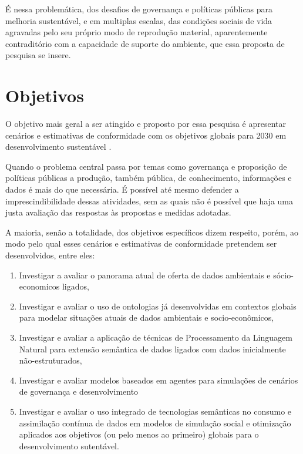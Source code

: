 \documentclass[
	11pt,				%
	openany,			%
	oneside,			%
	a4paper,			%
	english,			%
	french,				%
	spanish,			%
	brazil,				%
	]{abntex2}
\begin{document}
É nessa problemática, dos desafios de governança e políticas públicas para melhoria sustentável, e em multiplas escalas, das condições sociais de vida agravadas pelo seu próprio modo de reprodução material, aparentemente contraditório com a capacidade de suporte do ambiente, que essa proposta de pesquisa se insere. 

\chapter{Objetivos}

O objetivo mais geral a ser atingido e proposto por essa pesquisa é apresentar cenários e estimativas de conformidade \cite{patterson_exploring_2016} com os objetivos globais para 2030 em desenvolvimento sustentável \cite{united_nations_transforming_2015}.

Quando o problema central passa por temas como governança e proposição de políticas públicas a produção, também pública, de conhecimento, informações e dados é mais do que necessária. É possível até mesmo defender a imprescindibilidade dessas atividades, sem as quais não é possível que haja uma justa avaliação das respostas às propostas e medidas adotadas.

A maioria, senão a totalidade, dos objetivos específicos dizem respeito, porém, ao modo pelo qual esses cenários e estimativas de conformidade pretendem ser desenvolvidos, entre eles:

\begin{enumerate}
	\item Investigar a avaliar o panorama atual de oferta de dados ambientais e sócio-economicos ligados,
	\item Investigar e avaliar o uso de ontologias já desenvolvidas em contextos globais para modelar situações atuais de dados ambientais e socio-econômicos,
	\item Investigar e avaliar a aplicação de técnicas de Processamento da Linguagem Natural para extensão semântica de dados ligados com dados inicialmente não-estruturados,
	\item Investigar e avaliar modelos baseados em agentes para simulações de cenários de governança e desenvolvimento
	\item Investigar e avaliar o uso integrado de tecnologias semânticas no consumo e assimilação contínua de dados em modelos de simulação social e otimização aplicados aos objetivos (ou pelo menos ao primeiro) globais para o desenvolvimento sutentável.
\end{enumerate}
\end{document}
